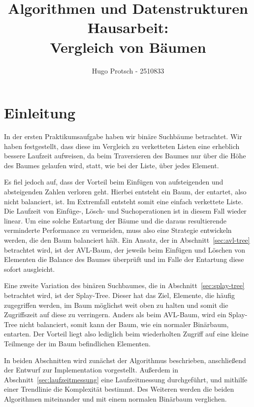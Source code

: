 \documentclass[a4paper]{article}
\title{Algorithmen und Datenstrukturen Hausarbeit:\\Vergleich von Bäumen}
\author{Hugo Protsch - 2510833}
\begin{document}
    \maketitle
    \tableofcontents
    \newpage
    \section*{Einleitung}\label{sec:Einleitung}

    In der ersten Praktikumsaufgabe haben wir binäre Suchbäume betrachtet.
    Wir haben festgestellt, dass diese im Vergleich zu verketteten Listen eine erheblich
    bessere Laufzeit aufweisen, da beim Traversieren des Baumes nur über die
    Höhe des Baumes gelaufen wird, statt, wie bei der Liste, über jedes Element.

    Es fiel jedoch auf, dass der Vorteil beim Einfügen von aufsteigenden und
    absteigenden Zahlen verloren geht.
    Hierbei entsteht ein Baum, der entartet, also nicht balanciert, ist.
    Im Extremfall entsteht somit eine einfach verkettete Liste.
    Die Laufzeit von Einfüge-, Lösch- und Suchoperationen
    ist in diesem Fall wieder linear.
    Um eine solche Entartung der Bäume und die daraus resultierende verminderte Performance
    zu vermeiden, muss also eine Strategie entwickeln werden, die den Baum balanciert hält.
    Ein Ansatz, der in Abschnitt~\ref{sec:avl-tree} betrachtet wird, ist der AVL-Baum,
    der jeweils beim Einfügen und Löschen von Elementen die
    Balance des Baumes überprüft und im Falle der Entartung diese sofort ausgleicht.

    Eine zweite Variation des binären Suchbaumes, die in Abschnitt~\ref{sec:splay-tree}
    betrachtet wird, ist der Splay-Tree.
    Dieser hat das Ziel, Elemente, die häufig zugegriffen werden, im Baum möglichst weit oben zu
    halten und somit die Zugriffszeit auf diese zu verringern.
    Anders als beim AVL-Baum, wird ein Splay-Tree nicht balanciert, somit kann der Baum, wie ein
    normaler Binärbaum, entarten.
    Der Vorteil liegt also lediglich beim wiederholten Zugriff auf eine kleine Teilmenge der im
    Baum befindlichen Elementen.

    In beiden Abschnitten wird zunächst der Algorithmus beschrieben, anschließend der Entwurf zur
    Implementation vorgestellt.
    Außerdem in Abschnitt~\ref{sec:laufzeitmessung} eine Laufzeitmessung durchgeführt, und mithilfe einer
    Trendlinie die Komplexität bestimmt.
    Des Weiteren werden die beiden Algorithmen miteinander und mit einem normalen Binärbaum
    verglichen.
\end{document}
